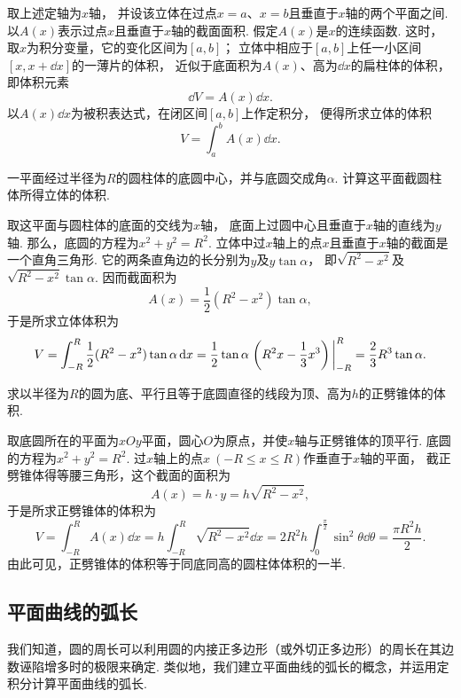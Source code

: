 取上述定轴为\(x\)轴，
并设该立体在过点\(x=a\)、\(x=b\)且垂直于\(x\)轴的两个平面之间.
以\(A(x)\)表示过点\(x\)且垂直于\(x\)轴的截面面积.
假定\(A(x)\)是\(x\)的连续函数.
这时，取\(x\)为积分变量，它的变化区间为\([a,b]\)；
立体中相应于\([a,b]\)上任一小区间\([x,x+\dd{x}]\)的一薄片的体积，
近似于底面积为\(A(x)\)、高为\(\dd{x}\)的扁柱体的体积，
即体积元素\[
	\dd{V} = A(x) \dd{x}.
\]
以\(A(x) \dd{x}\)为被积表达式，在闭区间\([a,b]\)上作定积分，
便得所求立体的体积\[
	V = \int_a^b A(x) \dd{x}.
\]

\begin{example}
一平面经过半径为\(R\)的圆柱体的底圆中心，并与底圆交成角\(\alpha\).
计算这平面截圆柱体所得立体的体积.
\begin{solution}
取这平面与圆柱体的底面的交线为\(x\)轴，
底面上过圆中心且垂直于\(x\)轴的直线为\(y\)轴.
那么，底圆的方程为\(x^2+y^2=R^2\).
立体中过\(x\)轴上的点\(x\)且垂直于\(x\)轴的截面是一个直角三角形.
它的两条直角边的长分别为\(y\)及\(y \tan\alpha\)，
即\(\sqrt{R^2-x^2}\)及\(\sqrt{R^2-x^2} \tan\alpha\).
因而截面积为\[
	A(x) = \frac12 (R^2-x^2) \tan\alpha,
\]
于是所求立体体积为\[
	V = \int_{-R}^R \frac12 (R^2-x^2) \tan\alpha \dd{x}
	= \frac12 \tan\alpha \eval{\left(R^2x-\frac13x^3\right)}_{-R}^R
	= \frac23 R^3 \tan\alpha.
\]
\end{solution}
\end{example}

\begin{example}
求以半径为\(R\)的圆为底、平行且等于底圆直径的线段为顶、高为\(h\)的正劈锥体的体积.
\begin{solution}
取底圆所在的平面为\(xOy\)平面，圆心\(O\)为原点，并使\(x\)轴与正劈锥体的顶平行.
底圆的方程为\(x^2+y^2=R^2\).
过\(x\)轴上的点\(x\ (-R \leq x \leq R)\)作垂直于\(x\)轴的平面，
截正劈锥体得等腰三角形，这个截面的面积为\[
	A(x) = h \cdot y = h \sqrt{R^2-x^2},
\]
于是所求正劈锥体的体积为\[
	V = \int_{-R}^R A(x) \dd{x}
	= h \int_{-R}^R \sqrt{R^2-x^2} \dd{x}
	= 2 R^2 h \int_0^{\frac\pi2} \sin^2\theta \dd{\theta}
	= \frac{\pi R^2 h}2.
\]
由此可见，正劈锥体的体积等于同底同高的圆柱体体积的一半.
\end{solution}
\end{example}

\subsection{平面曲线的弧长}
我们知道，圆的周长可以利用圆的内接正多边形（或外切正多边形）的周长在其边数诬陷增多时的极限来确定.
类似地，我们建立平面曲线的弧长的概念，并运用定积分计算平面曲线的弧长.

